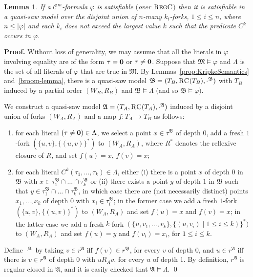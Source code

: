 \documentclass{LMCS}
\renewenvironment{proof}{\par\noindent\textbf{Proof.}}{\mbox{}\qed\par\medskip}
\theoremstyle{plain}
\newtheorem{lemma}[thm]{Lemma}
\newcommand{\cBCm}{\ensuremath{\mathcal{C}^m}}
\newcommand{\fA}{\mathfrak{A}}\newcommand{\fB}{\mathfrak{B}}\newcommand{\fM}{\mathfrak{M}}\newcommand{\cK}{\mathcal{K}}\newcommand{\R}{\mathbb{R}}\newcommand{\cR}{\mathcal{R}}\newcommand{\cL}{\mathcal{L}}\newcommand{\cLc}{\mathcal{L}c}\newcommand{\cLcc}{\mathcal{L}cc}
\newcommand{\Regc}{\textsc{RegC}}
\begin{document}
\begin{lemma}\label{lma:boundedDegree}
If a $\cBCm$-formula $\varphi$ is satisfiable $($over $\Regc$$)$ then
it is satisfiable in a quasi-saw model over the disjoint union of
$n$-many $k_i$-forks, $1 \leq i \leq n$, where $n\le |\varphi|$ and
each $k_i$ does not exceed the largest value $k$ such that the
predicate $C^k$ occurs in $\varphi$.
\end{lemma}
\begin{proof}
Without loss of generality, we may assume that all the literals in $\varphi$ involving equality are of the form $\tau = \mathbf{0}$ or $\tau \neq
\mathbf{0}$. Suppose that $\mathfrak M\models\varphi$ and $\Lambda$ is the set of all literals of $\varphi$
that are true in $\mathfrak M$. By Lemmas~\ref{prop:KripkeSemantics} and~\ref{broom-lemma},
there is a quasi-saw model $\fB=(T_B, \RegC (T_B),\cdot^\fB)$ with $T_B$ induced by a partial order $(W_B,R_B)$ and  $\fB \models \Lambda$ (and so $\fB \models \varphi)$.

We construct a quasi-saw model $\fA=(T_A, \RegC (T_A),\cdot^\fA)$ induced by a disjoint union of forks $(W_A,R_A)$ and a map $f\colon T_A\to T_B$ as follows:
\begin{enumerate}[$\bullet$]
\item for each literal $(\tau \neq \mathbf{0})\in\Lambda$, we
select a point $x\in \tau^\fB$ of depth $0$, add a fresh $1$-fork $(\{u,v\},\{(u,v)\}^*)$ to $(W_A,R_A)$, where $R^*$ denotes the reflexive closure of $R$, and set $f(u) = x$, $f(v) = x$;

\item for each literal $C^k(\tau_1, \dots, \tau_k)\in\Lambda$, either (i) there is a point $x$ of depth $0$ in $\fB$ with $x \in \tau_1^\fB \cap
\dots \cap \tau_k^\fB$ or (ii) there exists a point $y$ of depth $1$ in $\fB$ such that $y \in \tau_1^\fB \cap
\dots \cap \tau_k^\fB$, in which case there are (not necessarily distinct) points $x_1,\dots,x_k$ of depth $0$ with $x_i \in \tau_i^\fB$; in the former case we add a fresh $1$-fork $(\{u,v\},\{(u,v)\}^*)$ to $(W_A, R_A)$ and set $f(u) = x$ and $f(v) = x$; in the latter case we add a fresh $k$-fork $(\{u,v_1,\dots,v_k\},\{(u,v_i) \mid 1 \leq i \leq k)\}^*)$ to $(W_A, R_A)$ and set $f(u) = y$ and $f(v_i) = x_i$, for $1 \leq i \leq k$.
\end{enumerate}
Define $\cdot^\fA$ by taking $v \in r^\fA$ iff $f(v) \in r^\fB$, for every $v$ of depth $0$, and $u \in r^\fA$ iff there is $v \in r^\fA$ of depth 0 with $uR_Av$, for every $u$ of depth 1. By definition, $r^\fA$ is regular closed in $\fA$, and it is easily checked that $\fA \models \Lambda$.
\end{proof}
\end{document}
